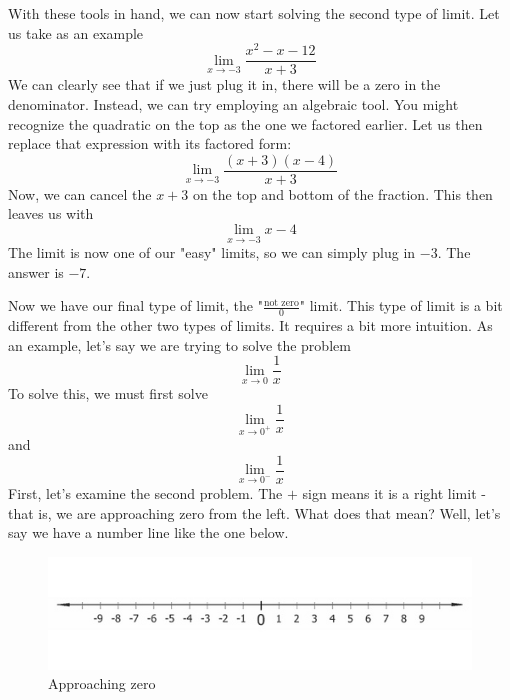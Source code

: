 With these tools in hand, we can now start solving the second type of limit. 
Let us take as an example 
\begin{equation*}
    \lim\limits_{x\rightarrow -3}\frac{x^2-x-12}{x+3}
\end{equation*}
We can clearly see that if we just plug it in, there will be a zero in the denominator. 
Instead, we can try employing an algebraic tool. 
You might recognize the quadratic on the top as the one we factored earlier. 
Let us then replace that expression with its factored form:
\begin{equation*}
    \lim\limits_{x\rightarrow -3}\frac{(x+3)(x-4)}{x+3}
\end{equation*}
Now, we can cancel the $x+3$ on the top and bottom of the fraction. 
This then leaves us with
\begin{equation*}
    \lim\limits_{x\rightarrow -3}x-4
\end{equation*}
The limit is now one of our "easy" limits, so we can simply plug in $-3$. The answer is $-7$.

Now we have our final type of limit, the "$\frac{\text{not zero}}{0}$" limit. 
This type of limit is a bit different from the other two types of limits. 
It requires a bit more intuition. As an example, let's say we are trying to solve the problem
\begin{equation*}
    \lim\limits_{x\rightarrow 0}\frac{1}{x}
\end{equation*}
To solve this, we must first solve
\begin{equation*}
    \lim\limits_{x\rightarrow 0^+}\frac{1}{x}
\end{equation*}
and
\begin{equation*}
    \lim\limits_{x\rightarrow 0^-}\frac{1}{x}
\end{equation*}
First, let's examine the second problem. 
The $+$ sign means it is a right limit - that is, we are approaching zero from the left. 
What does that mean? Well, let's say we have a number line like the one below.

\begin{figure}[H]
\caption{Approaching zero}
\includegraphics[scale=0.75]{../numberline.jpg}
\end{figure}


